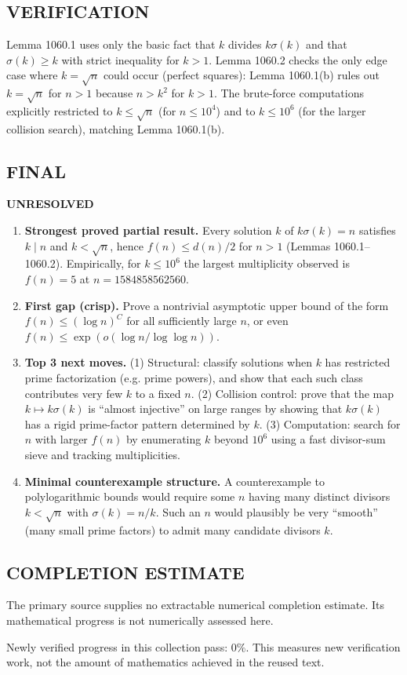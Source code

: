 \subsection*{VERIFICATION}
Lemma 1060.1 uses only the basic fact that $k$ divides $k\sigma(k)$ and that $\sigma(k)\ge k$ with strict inequality for $k>1$.
Lemma 1060.2 checks the only edge case where $k=\sqrt n$ could occur (perfect squares): Lemma 1060.1(b) rules out $k=\sqrt n$ for $n>1$ because $n>k^2$ for $k>1$.
The brute-force computations explicitly restricted to $k\le \sqrt n$ (for $n\le 10^4$) and to $k\le 10^6$ (for the larger collision search), matching Lemma 1060.1(b).

\subsection*{FINAL}
\textbf{UNRESOLVED}
\begin{enumerate}
\item[(i)] \textbf{Strongest proved partial result.}
Every solution $k$ of $k\sigma(k)=n$ satisfies $k\mid n$ and $k<\sqrt n$, hence $f(n)\le d(n)/2$ for $n>1$ (Lemmas 1060.1--1060.2). Empirically, for $k\le 10^6$ the largest multiplicity observed is $f(n)=5$ at $n=1584858562560$.
\item[(ii)] \textbf{First gap (crisp).}
Prove a nontrivial asymptotic upper bound of the form $f(n)\le (\log n)^{C}$ for all sufficiently large $n$, or even $f(n)\le \exp(o(\log n/\log\log n))$.
\item[(iii)] \textbf{Top 3 next moves.}
(1) Structural: classify solutions when $k$ has restricted prime factorization (e.g. prime powers), and show that each such class contributes very few $k$ to a fixed $n$.
(2) Collision control: prove that the map $k\mapsto k\sigma(k)$ is ``almost injective'' on large ranges by showing that $k\sigma(k)$ has a rigid prime-factor pattern determined by $k$.
(3) Computation: search for $n$ with larger $f(n)$ by enumerating $k$ beyond $10^6$ using a fast divisor-sum sieve and tracking multiplicities.
\item[(iv)] \textbf{Minimal counterexample structure.}
A counterexample to polylogarithmic bounds would require some $n$ having many distinct divisors $k<\sqrt n$ with $\sigma(k)=n/k$. Such an $n$ would plausibly be very ``smooth'' (many small prime factors) to admit many candidate divisors $k$.
\end{enumerate}




\subsection*{COMPLETION ESTIMATE}
The primary source supplies no extractable numerical completion estimate. Its mathematical progress is not numerically assessed here.

Newly verified progress in this collection pass: $0\%$. This measures new verification work, not the amount of mathematics achieved in the reused text.
